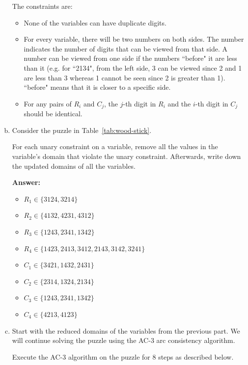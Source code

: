 \documentclass[12pt]{article}
\begin{document}
\begin{enumerate}[(a)]
The constraints are:
\begin{itemize}
    \item None of the variables can have duplicate digits.
    \item For every variable, there will be two numbers on both sides. The number indicates the number of digits that can be viewed from that side. A number can be viewed from one side if the numbers ``before" it are less than it (e.g. for ``2134", from the left side, 3 can be viewed since 2 and 1 are less than 3 whereas 1 cannot be seen since 2 is greater than 1). ``before" means that it is closer to a specific side.
     \item For any pairs of $R_i$ and $C_j$, the $j$-th digit in $R_i$ and the $i$-th digit in $C_j$ should be identical.
\end{itemize}

\item 
Consider the puzzle in Table~\ref{tab:wood-stick}.

For each unary constraint on a variable, remove all the values in the variable's domain that violate the unary constraint. Afterwards, write down the updated domains of all the variables. 

{\bf Answer:}

\begin{itemize}
\item $R_1 \in \{3124, 3214\}$ 
\item $R_2 \in \{4132, 4231, 4312\}$ 
\item $R_3 \in \{1243, 2341, 1342\}$ 
\item $R_4 \in \{1423, 2413, 3412,  2143, 3142, 3241\}$ 
\item $C_1 \in \{3421, 1432, 2431\}$
\item $C_2 \in \{2314, 1324, 2134\}$
\item $C_3 \in \{1243, 2341, 1342\}$
\item $C_4 \in \{4213, 4123\}$
\end{itemize}




\item
Start with the reduced domains of the variables from the previous part. We will continue solving the puzzle using the AC-3 arc consistency algorithm.

Execute the AC-3 algorithm on the puzzle for 8 steps as described below. 


\end{enumerate}
\end{document}
